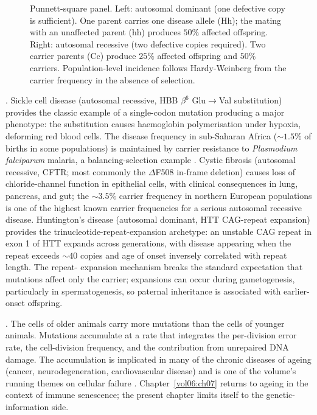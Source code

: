 \begin{figure}[h]
\centering

\caption{Punnett-square panel. Left: autosomal dominant (one defective
copy is sufficient). One parent carries one disease allele (Hh); the
mating with an unaffected parent (hh) produces $50\%$ affected
offspring. Right: autosomal recessive (two defective copies required).
Two carrier parents (Cc) produce $25\%$ affected offspring and $50\%$
carriers. Population-level incidence follows Hardy-Weinberg from the
carrier frequency in the absence of selection.}
\label{fig:punnett}
\end{figure}

. Sickle cell disease
(autosomal recessive, HBB $\beta^6$ Glu$\to$Val substitution) provides
the classic example of a single-codon mutation producing a major
phenotype: the substitution causes haemoglobin polymerisation under
hypoxia, deforming red blood cells. The disease frequency in
sub-Saharan Africa ($\sim 1.5\%$ of births in some populations) is
maintained by carrier resistance to \emph{Plasmodium falciparum}
malaria, a balancing-selection example
\cite{web:v6c03-genereviews-2024}. Cystic fibrosis (autosomal
recessive, CFTR; most commonly the $\Delta$F508 in-frame deletion)
causes loss of chloride-channel function in epithelial cells, with
clinical consequences in lung, pancreas, and gut; the $\sim 3.5\%$
carrier frequency in northern European populations is one of the
highest known carrier frequencies for a serious autosomal recessive
disease. Huntington's disease (autosomal dominant, HTT CAG-repeat
expansion) provides the trinucleotide-repeat-expansion archetype: an
unstable CAG repeat in exon 1 of HTT expands across generations,
with disease appearing when the repeat exceeds $\sim 40$ copies and
age of onset inversely correlated with repeat length. The repeat-
expansion mechanism breaks the standard expectation that mutations
affect only the carrier; expansions can occur during gametogenesis,
particularly in spermatogenesis, so paternal inheritance is associated
with earlier-onset offspring.

. The cells of older
animals carry more mutations than the cells of younger animals.
Mutations accumulate at a rate that integrates the per-division
error rate, the cell-division frequency, and the contribution from
unrepaired DNA damage. The accumulation is implicated in many of the
chronic diseases of ageing (cancer, neurodegeneration,
cardiovascular disease) and is one of the volume's running themes
on cellular failure \cite{paper:v6c03-blokzijl-2016}.
Chapter~\ref{vol06:ch07} returns to ageing in the context of immune
senescence; the present chapter limits itself to the genetic-
information side.


